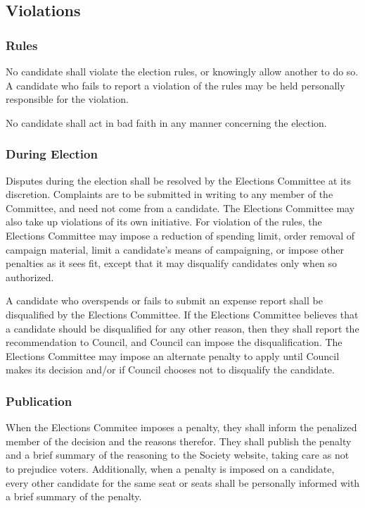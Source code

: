 \subsection{Violations}
\subsubsection{Rules}
No candidate shall violate the election rules, or knowingly allow another to do
so. A candidate who fails to report a violation of the rules may be held
personally responsible for the violation.

No candidate shall act in bad faith in any manner concerning the election.

\subsubsection{During Election}
Disputes during the election shall be resolved by the Elections Committee at its
discretion. Complaints are to be submitted in writing to any member of the
Committee, and need not come from a candidate. The Elections Committee may also
take up violations of its own initiative. For violation of the rules, the
Elections Committee may impose a reduction of spending limit, order removal of
campaign material, limit a candidate's means of campaigning, or impose other
penalties as it sees fit, except that it may disqualify candidates only when so
authorized.

A candidate who overspends or fails to submit an expense report shall be
disqualified by the Elections Committee. If the Elections Committee believes
that a candidate should be disqualified for any other reason, then they shall
report the recommendation to Council, and Council can impose the
disqualification. The Elections Committee may impose an alternate penalty to
apply until Council makes its decision and/or if Council chooses not to
disqualify the candidate.

\subsubsection{Publication}
When the Elections Commitee imposes a penalty, they shall inform the penalized
member of the decision and the reasons therefor. They shall publish the penalty
and a brief summary of the reasoning to the Society website, taking care as not
to prejudice voters.  Additionally, when a penalty is imposed on a candidate,
every other candidate for the same seat or seats shall be personally informed
with a brief summary of the penalty.


